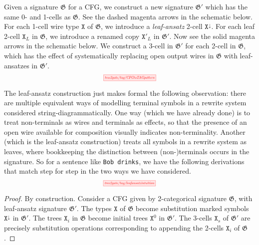 \begin{construction}
Given a signature $\mathfrak{G}$ for a CFG, we construct a new signature $\mathfrak{G}'$ which has the same 0- and 1-cells as $\mathfrak{G}$. See the dashed magenta arrows in the schematic below. For each 1-cell wire type $\texttt{X}$ of $\mathfrak{G}$, we introduce a \emph{leaf-ansatz} 2-cell $\texttt{X}^\downarrow$. For each leaf 2-cell $\texttt{X}_L$ in $\mathfrak{G}$, we introduce a renamed copy $\texttt{X}'_L$ in $\mathfrak{G}'$. Now see the solid magenta arrows in the schematic below. We construct a 3-cell in $\mathfrak{G}'$ for each 2-cell in $\mathfrak{G}$, which has the effect of systematically replacing open output wires in $\mathfrak{G}$ with leaf-ansatzes in $\mathfrak{G}'$.
\[\scalebox{0.5}{\tikzfig{tree2gate/tag/CFGtoTAGpattern}}\]
\end{construction}

\begin{example}
The leaf-ansatz construction just makes formal the following observation: there are multiple equivalent ways of modelling terminal symbols in a rewrite system considered string-diagrammatically. One way (which we have already done) is to treat non-terminals as wires and terminals as effects, so that the presence of an open wire available for composition visually indicates non-terminality. Another (which is the leaf-ansatz construction) treats all symbols in a rewrite system as leaves, where bookkeeping the distinction between (non-)terminals occurs in the signature. So for a sentence like \texttt{Bob drinks}, we have the following derivations that match step for step in the two ways we have considered.
\[\scalebox{0.5}{\tikzfig{tree2gate/tag/leafansatzintuition}}\]
\end{example}

\begin{proposition}\label{prop:cfgastag1}
\begin{proof}
By construction. Consider a CFG given by 2-categorical signature $\mathfrak{G}$, with leaf-ansatz signature $\mathfrak{G}'$. The types $\texttt{X}$ of $\mathfrak{G}$ become substitution marked symbols $\texttt{X}^{\downarrow}$ in $\mathfrak{G}'$. The trees $\texttt{X}_i$ in $\mathfrak{G}$ become initial trees $\texttt{X}^0$ in $\mathfrak{G}'$. The 3-cells $\texttt{X}_s$ of $\mathfrak{G}'$ are precisely substitution operations corresponding to appending the 2-cells $\texttt{X}_i$ of $\mathfrak{G}$.
\end{proof}
\end{proposition}

